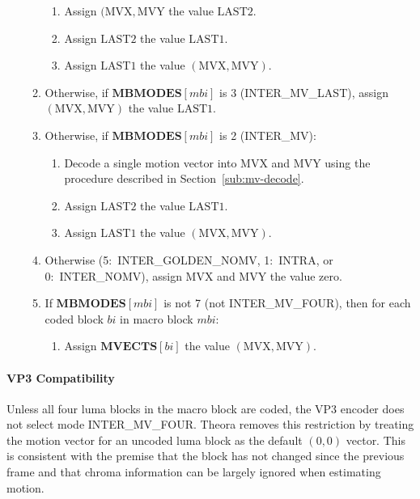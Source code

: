 \documentclass[9pt,letterpaper]{book}
\newcommand{\idx}[1]{{\ensuremath{\mathit{#1}}}}
\newcommand{\bi}{\idx{bi}}
\newcommand{\mbi}{\idx{mbi}}
\newcommand{\bitvar}[1]{\ensuremath{\mathbf{\bm{#1}}}}
\newcommand{\locvar}[1]{\ensuremath{\mathrm{#1}}}
\numberwithin{equation}{chapter}
\numberwithin{figure}{chapter}
\numberwithin{table}{chapter}
\begin{document}
\begin{enumerate}
\begin{enumerate}
\begin{enumerate}
\item
Assign $(\locvar{MVX},\locvar{MVY}$ the value \locvar{LAST2}.
\item
Assign \locvar{LAST2} the value \locvar{LAST1}.
\item
Assign \locvar{LAST1} the value $(\locvar{MVX},\locvar{MVY})$.
\end{enumerate}
\item
Otherwise, if $\bitvar{MBMODES}[\locvar{\mbi}]$ is 3 (INTER\_MV\_LAST), assign
 $(\locvar{MVX},\locvar{MVY})$ the value \locvar{LAST1}.
\item
Otherwise, if $\bitvar{MBMODES}[\locvar{\mbi}]$ is 2 (INTER\_MV):
\begin{enumerate}
\item
Decode a single motion vector into \locvar{MVX} and \locvar{MVY} using the
 procedure described in Section~\ref{sub:mv-decode}.
\item
Assign \locvar{LAST2} the value \locvar{LAST1}.
\item
Assign \locvar{LAST1} the value $(\locvar{MVX},\locvar{MVY})$.
\end{enumerate}
\item
Otherwise (5:~INTER\_GOLDEN\_NOMV, 1:~INTRA, or \\
 0:~INTER\_NOMV), assign \locvar{MVX} and \locvar{MVY} the value zero.
\item
If $\bitvar{MBMODES}[\locvar{\mbi}]$ is not 7 (not INTER\_MV\_FOUR), then for
 each coded block \locvar{\bi} in macro block \locvar{\mbi}:
\begin{enumerate}
\item
Assign $\bitvar{MVECTS}[\locvar{\bi}]$ the value $(\locvar{MVX},\locvar{MVY})$.
\end{enumerate}
\end{enumerate}
\end{enumerate}

\paragraph{VP3 Compatibility}

Unless all four luma blocks in the macro block are coded, the VP3 encoder does
 not select mode INTER\_MV\_FOUR.
Theora removes this restriction by treating the motion vector for an uncoded
 luma block as the default $(0,0)$ vector.
This is consistent with the premise that the block has not changed since the
 previous frame and that chroma information can be largely ignored when
 estimating motion.
\end{document}
